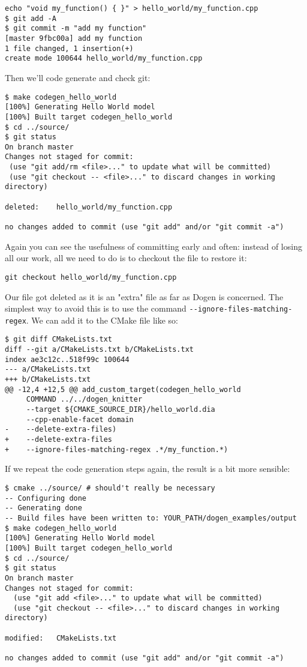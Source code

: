\documentclass[11pt]{article}
\begin{document}
\begin{verbatim}
echo "void my_function() { }" > hello_world/my_function.cpp
$ git add -A
$ git commit -m "add my function"
[master 9fbc00a] add my function
1 file changed, 1 insertion(+)
create mode 100644 hello_world/my_function.cpp
\end{verbatim}

Then we'll code generate and check git:

\begin{verbatim}
$ make codegen_hello_world
[100%] Generating Hello World model
[100%] Built target codegen_hello_world
$ cd ../source/
$ git status
On branch master
Changes not staged for commit:
 (use "git add/rm <file>..." to update what will be committed)
 (use "git checkout -- <file>..." to discard changes in working directory)

deleted:    hello_world/my_function.cpp

no changes added to commit (use "git add" and/or "git commit -a")
\end{verbatim}

Again you can see the usefulness of committing early and often:
instead of losing all our work, all we need to do is to checkout the
file to restore it:

\begin{verbatim}
git checkout hello_world/my_function.cpp
\end{verbatim}

Our file got deleted as it is an "extra" file as far as Dogen is
concerned. The simplest way to avoid this is to use the command
\texttt{-{}-ignore-files-matching-regex}. We can add it to the CMake file like
so:

\begin{verbatim}
$ git diff CMakeLists.txt
diff --git a/CMakeLists.txt b/CMakeLists.txt
index ae3c12c..518f99c 100644
--- a/CMakeLists.txt
+++ b/CMakeLists.txt
@@ -12,4 +12,5 @@ add_custom_target(codegen_hello_world
     COMMAND ../../dogen_knitter
     --target ${CMAKE_SOURCE_DIR}/hello_world.dia
     --cpp-enable-facet domain
-    --delete-extra-files)
+    --delete-extra-files
+    --ignore-files-matching-regex .*/my_function.*)
\end{verbatim}

If we repeat the code generation steps again, the result is a bit more
sensible:

\begin{verbatim}
$ cmake ../source/ # should't really be necessary
-- Configuring done
-- Generating done
-- Build files have been written to: YOUR_PATH/dogen_examples/output
$ make codegen_hello_world
[100%] Generating Hello World model
[100%] Built target codegen_hello_world
$ cd ../source/
$ git status
On branch master
Changes not staged for commit:
  (use "git add <file>..." to update what will be committed)
  (use "git checkout -- <file>..." to discard changes in working directory)

modified:   CMakeLists.txt

no changes added to commit (use "git add" and/or "git commit -a")
\end{verbatim}
\end{document}
